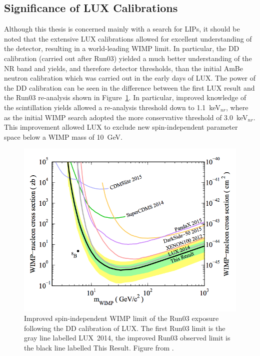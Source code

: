 

\FloatBarrier
\subsection{Significance of LUX Calibrations}
Although this thesis is concerned mainly with a search for \ac{LIP}s, it should be noted that the extensive \ac{LUX} calibrations allowed for excellent understanding of the detector, resulting in a world-leading \ac{WIMP} limit. In particular, the \ac{DD} calibration (carried out after Run03) yielded a much better understanding of the \ac{NR} band and yields, and therefore detector thresholds, than the initial AmBe neutron calibration which was carried out in the early days of \ac{LUX}. The power of the \ac{DD} calibration can be seen in the difference between the first \ac{LUX} result \cite{LUXFirstResults} and the Run03 re-analysis \cite{LUXReanalysis} shown in Figure~\ref{fig:lux_reanalysis}. In particular, improved knowledge of the scintillation yields allowed a re-analysis threshold down to 1.1~keV$_{nr}$, where as the initial \ac{WIMP} search adopted the more conservative threshold of 3.0~keV$_{nr}$. This improvement allowed \ac{LUX} to exclude new spin-independent parameter space below a \ac{WIMP} mass of 10~GeV. 


\begin{figure}[htbp]
\begin{center}
\includegraphics[width=\textwidth]{figures/lux/lux_reanalysis.png}
\caption{Improved spin-independent \acs{WIMP} limit of the Run03 exposure following the \acs{DD} calibration of \acs{LUX}. The first Run03 limit is the gray line labelled LUX~2014, the improved Run03 observed limit is the black line labelled This Result.  Figure from \cite{LUXReanalysis}.}
\label{fig:lux_reanalysis}
\end{center}
\end{figure}

